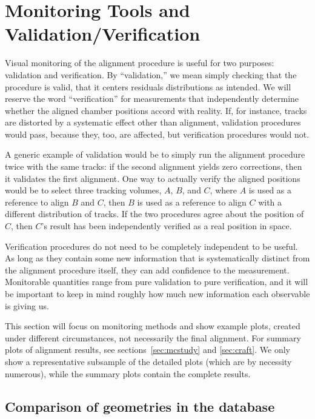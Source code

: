 \documentclass[12pt]{article}
\begin{document}
\section{Monitoring Tools and Validation/Verification}

Visual monitoring of the alignment procedure is useful for two
purposes: validation and verification.  By ``validation,'' we mean
simply checking that the procedure is valid, that it centers residuals
distributions as intended.  We will reserve the word ``verification''
for measurements that independently determine whether the aligned
chamber positions accord with reality.  If, for instance, tracks are
distorted by a systematic effect other than alignment, validation
procedures would pass, because they, too, are affected, but
verification procedures would not.

A generic example of validation would be to simply run the alignment
procedure twice with the same tracks: if the second alignment yields
zero corrections, then it validates the first alignment.  One way to
actually verify the aligned positions would be to select three
tracking volumes, $A$, $B$, and $C$, where $A$ is used as a reference
to align $B$ and $C$, then $B$ is used as a reference to align $C$
with a different distribution of tracks.  If the two procedures agree
about the position of $C$, then $C$'s result has been independently
verified as a real position in space.

Verification procedures do not need to be completely independent to be
useful.  As long as they contain some new information that is
systematically distinct from the alignment procedure itself, they can
add confidence to the measurement.  Monitorable quantities range from
pure validation to pure verification, and it will be important to keep
in mind roughly how much new information each observable is giving us.

This section will focus on monitoring methods and show example plots,
created under different circumstances, not necessarily the final
alignment.  For summary plots of alignment results, see
sections~\ref{sec:mcstudy} and \ref{sec:craft}.  We only show a
representative subsample of the detailed plots (which are by necessity
numerous), while the summary plots contain the complete results.

\subsection{Comparison of geometries in the database}
\end{document}
